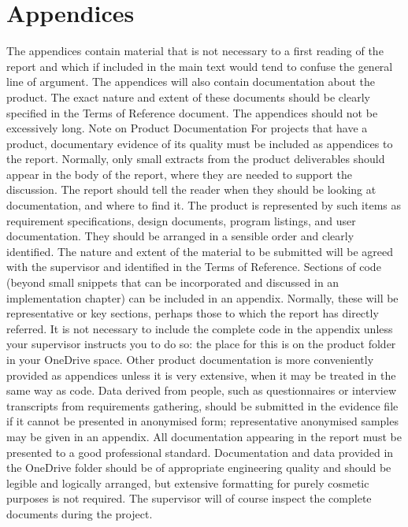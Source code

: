 \documentclass[11pt, twoside, a4paper]{report}
\newcommand{\todoinline}[1]{
    \begin{sloppypar}
        \colorlet{todo old}{.}
        \color{red}
        #1
        \color{todo old}
        \todo{See inline comment}
    \end{sloppypar}
}
\begin{document}
\chapter{Appendices}
\todoinline{
    The appendices contain material that is not necessary to a first reading of the report and which if included in the main text would tend to confuse the general line
    of argument. The appendices will also contain documentation about the product. The exact nature and extent of these documents should be clearly specified in the Terms
    of Reference document. The appendices should not be excessively long.
    Note on Product Documentation
    For projects that have a product, documentary evidence of its quality must be included as appendices to the report. Normally, only small extracts from the product
    deliverables should appear in the body of the report, where they are needed to support the discussion. The report should tell the reader when they should be looking
    at documentation, and where to find it.
    The product is represented by such items as requirement specifications, design documents, program listings, and user documentation. They should be arranged in a
    sensible order and clearly identified. The nature and extent of the material to be submitted will be agreed with the supervisor and identified in the Terms of Reference.
    Sections of code (beyond small snippets that can be incorporated and discussed in an implementation chapter) can be included in an appendix. Normally, these will be
    representative or key sections, perhaps those to which the report has directly referred. It is not necessary to include the complete code in the appendix unless your
    supervisor instructs you to do so: the place for this is on the product folder in your OneDrive space.
    Other product documentation is more conveniently provided as appendices unless it is very extensive, when it may be treated in the same way as code. Data derived from
    people, such as questionnaires or interview transcripts from requirements gathering, should be submitted in the evidence file if it cannot be presented in anonymised
    form; representative anonymised samples may be given in an appendix.
    All documentation appearing in the report must be presented to a good professional standard. Documentation and data provided in the OneDrive folder should be of
    appropriate engineering quality and should be legible and logically arranged, but extensive formatting for purely cosmetic purposes is not required. The supervisor
    will of course inspect the complete documents during the project.
}
\end{document}

